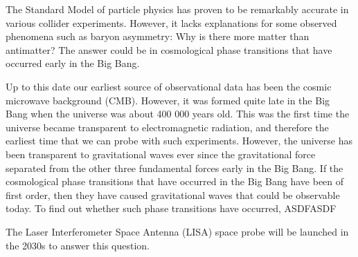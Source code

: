 \iffalse
Motivation
\begin{itemize}
    \item Standard model: matches observations but lacks important explanations
    \item Baryon asymmetry
    \item GWs: a window to physics beyond the SM
    \item By phase transitions
    \item LISA project
\end{itemize}

The thesis
\begin{itemize}
    \item Highlights from the work, especially the title / thesis statement
    \item Findings
    \item Conclusion
\end{itemize}

This is among the last sections to be written.
\fi

The Standard Model of particle physics has proven to be remarkably accurate in various collider experiments.
However, it lacks explanations for some observed phenomena such as baryon asymmetry: Why is there more matter than antimatter?
The answer could be in cosmological phase transitions that have occurred early in the Big Bang.

Up to this date our earliest source of observational data has been the cosmic microwave background (CMB).
However, it was formed quite late in the Big Bang when the universe was about 400 000 years old.
This was the first time the universe became transparent to electromagnetic radiation,
and therefore the earliest time that we can probe with such experiments.
However, the universe has been transparent to gravitational waves ever since the gravitational force separated from the other three fundamental forces early in the Big Bang.
If the cosmological phase transitions that have occurred in the Big Bang have been of first order,
then they have caused gravitational waves that could be observable today.
To find out whether such phase transitions have occurred,
ASDFASDF

The Laser Interferometer Space Antenna (LISA) space probe will be launched in the 2030s to answer this question.
